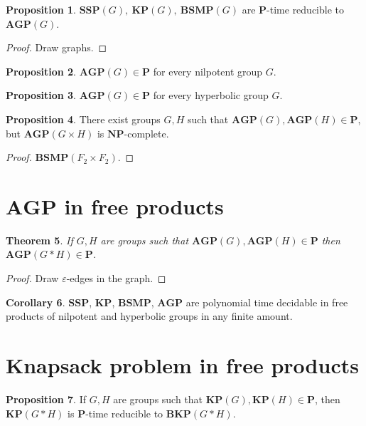 \documentclass[10pt]{amsart}
\newtheorem{theorem}{Theorem}[section]
\theoremstyle{definition}
\newtheorem{proposition}[theorem]{Proposition}
\newtheorem{corollary}[theorem]{Corollary}
\def\P{{\mathbf{P}}}
\def\NP{{\mathbf{NP}}}
\def\SSP{{\mathbf{SSP}}}
\def\BSMP{{\mathbf{BSMP}}}
\def\BKP{{\mathbf{BKP}}}
\def\KP{{\mathbf{KP}}}
\def\AGP{{\mathbf{AGP}}}
\begin{document}
\begin{proposition}
$\SSP(G),\ \KP(G),\ \BSMP(G)$ are $\P$-time reducible to $\AGP(G)$.
\end{proposition}
\begin{proof} Draw graphs.
\end{proof}

\begin{proposition}
$\AGP(G)\in\P$ for every nilpotent group $G$.
\end{proposition}

\begin{proposition}
$\AGP(G)\in\P$ for every hyperbolic group $G$.
\end{proposition}


\begin{proposition}
There exist groups $G,H$ such that $\AGP(G),\AGP(H)\in\P$, but $\AGP(G\times H)$ is $\NP$-complete.
\end{proposition}
\begin{proof}
$\BSMP(F_2\times F_2)$.
\end{proof}

\section{$\AGP$ in free products}\label{sec:free_prod}
\begin{theorem}
If $G,H$ are groups such that $\AGP(G),\AGP(H)\in\P$ then $\AGP(G*H)\in\P$.
\end{theorem}
\begin{proof}
Draw $\varepsilon$-edges in the graph.
\end{proof}
\begin{corollary}
$\SSP$, $\KP$, $\BSMP$, $\AGP$ are polynomial time decidable in free products of nilpotent and hyperbolic groups in any finite amount.
\end{corollary}

\section{Knapsack problem in free products}\label{sec:knapsack}

\begin{proposition}
If $G,H$ are groups such that $\KP(G),\KP(H)\in\P$, then $\KP(G*H)$ is $\P$-time reducible to $\BKP(G*H)$.
\end{proposition}


%

\end{document}
